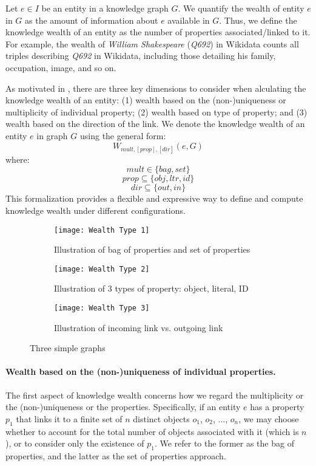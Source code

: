 Let \(e \in I\) be an entity in a knowledge graph \(G\). We quantify the wealth of entity \(e\) in \(G\) as the amount of information about \(e\) available in \(G\). Thus, we define the knowledge wealth of an entity as the number of properties associated/linked to it. For example, the wealth of \textit{William Shakespeare} (\textit{Q692}) in Wikidata counts all triples describing \textit{Q692} in Wikidata, including those detailing his family, occupation, image, and so on.

As motivated in , there are three key dimensions to consider when alculating the knowledge wealth of an entity: (1) wealth based on the (non-)uniqueness or multiplicity of individual property; (2) wealth based on type of property; and (3) wealth based on the direction of the link. We denote the knowledge wealth of an entity \(e\) in graph \(G\) using the general form:
\[
    W_{mult,[prop],[dir]}(e,G)
\]
where:
\[
    mult \in  \{bag, set\}
\]
\[
    prop \subseteq  \{obj, ltr, id\}
\]
\[
    dir \subseteq  \{out, in\}
\]
This formalization provides a flexible and expressive way to define and compute knowledge wealth under different configurations.

\begin{figure}[!h]
    \centering
    \begin{subfigure}[b]{0.3\textwidth}
        \centering
        \texttt{[image: Wealth Type 1]}
        \caption{Illustration of bag of properties and set of properties} \label{fig:wealth-type1}
    \end{subfigure}
    \hfill
    \begin{subfigure}[b]{0.3\textwidth}
        \centering
        \texttt{[image: Wealth Type 2]}
        \caption{Illustration of 3 types of property: object, literal, ID} \label{fig:wealth-type2}
    \end{subfigure}
    \hfill
    \begin{subfigure}[b]{0.3\textwidth}
        \centering
        \texttt{[image: Wealth Type 3]}
        \caption{Illustration of incoming link vs. outgoing link} \label{fig:wealth-type3}
    \end{subfigure}
    \caption{Three simple graphs} \label{fig:three graphs}
\end{figure}

\paragraph{Wealth based on the (non-)uniqueness of individual properties.}
The first aspect of knowledge wealth concerns how we regard the multiplicity or the (non-)uniqueness or the properties. Specifically, if an entity \(e\) has a property \(p_1\) that links it to a finite set of \(n\) distinct objects \(o_1\), \(o_2\), ..., \(o_n\), we may choose whether to account for the total number of objects associated with it (which is \(n\)), or to consider only the existence of \(p_1\). We refer to the former as the bag of properties, and the latter as the set of properties approach.

